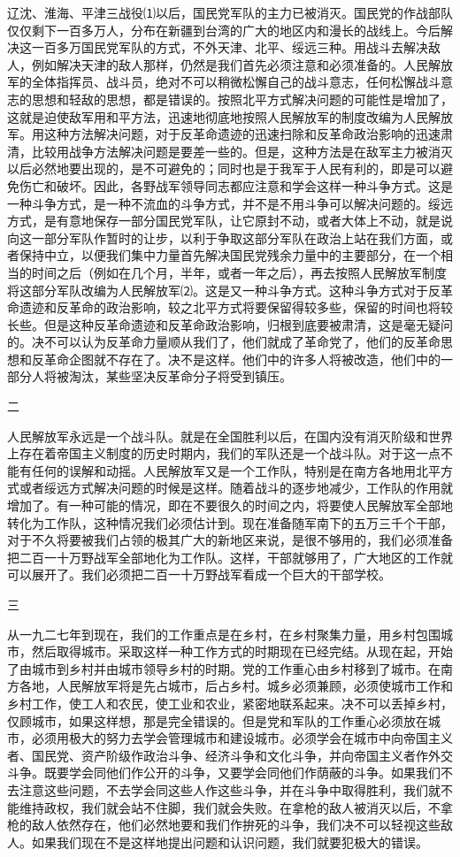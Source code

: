 \documentclass[UTF-8, a5paper, 12pt]{ctexart}
\begin{document}
辽沈、淮海、平津三战役⑴以后，国民党军队的主力已被消灭。国民党的作战部队仅仅剩下一百多万人，分布在新疆到台湾的广大的地区内和漫长的战线上。今后解决这一百多万国民党军队的方式，不外天津、北平、绥远三种。用战斗去解决敌人，例如解决天津的敌人那样，仍然是我们首先必须注意和必须准备的。人民解放军的全体指挥员、战斗员，绝对不可以稍微松懈自己的战斗意志，任何松懈战斗意志的思想和轻敌的思想，都是错误的。按照北平方式解决问题的可能性是增加了，这就是迫使敌军用和平方法，迅速地彻底地按照人民解放军的制度改编为人民解放军。用这种方法解决问题，对于反革命遗迹的迅速扫除和反革命政治影响的迅速肃清，比较用战争方法解决问题是要差一些的。但是，这种方法是在敌军主力被消灭以后必然地要出现的，是不可避免的；同时也是于我军于人民有利的，即是可以避免伤亡和破坏。因此，各野战军领导同志都应注意和学会这样一种斗争方式。这是一种斗争方式，是一种不流血的斗争方式，并不是不用斗争可以解决问题的。绥远方式，是有意地保存一部分国民党军队，让它原封不动，或者大体上不动，就是说向这一部分军队作暂时的让步，以利于争取这部分军队在政治上站在我们方面，或者保持中立，以便我们集中力量首先解决国民党残余力量中的主要部分，在一个相当的时间之后（例如在几个月，半年，或者一年之后），再去按照人民解放军制度将这部分军队改编为人民解放军⑵。这是又一种斗争方式。这种斗争方式对于反革命遗迹和反革命的政治影响，较之北平方式将要保留得较多些，保留的时间也将较长些。但是这种反革命遗迹和反革命政治影响，归根到底要被肃清，这是毫无疑问的。决不可以认为反革命力量顺从我们了，他们就成了革命党了，他们的反革命思想和反革命企图就不存在了。决不是这样。他们中的许多人将被改造，他们中的一部分人将被淘汰，某些坚决反革命分子将受到镇压。

二

人民解放军永远是一个战斗队。就是在全国胜利以后，在国内没有消灭阶级和世界上存在着帝国主义制度的历史时期内，我们的军队还是一个战斗队。对于这一点不能有任何的误解和动摇。人民解放军又是一个工作队，特别是在南方各地用北平方式或者绥远方式解决问题的时候是这样。随着战斗的逐步地减少，工作队的作用就增加了。有一种可能的情况，即在不要很久的时间之内，将要使人民解放军全部地转化为工作队，这种情况我们必须估计到。现在准备随军南下的五万三千个干部，对于不久将要被我们占领的极其广大的新地区来说，是很不够用的，我们必须准备把二百一十万野战军全部地化为工作队。这样，干部就够用了，广大地区的工作就可以展开了。我们必须把二百一十万野战军看成一个巨大的干部学校。

三

从一九二七年到现在，我们的工作重点是在乡村，在乡村聚集力量，用乡村包围城市，然后取得城市。采取这样一种工作方式的时期现在已经完结。从现在起，开始了由城市到乡村并由城市领导乡村的时期。党的工作重心由乡村移到了城市。在南方各地，人民解放军将是先占城市，后占乡村。城乡必须兼顾，必须使城市工作和乡村工作，使工人和农民，使工业和农业，紧密地联系起来。决不可以丢掉乡村，仅顾城市，如果这样想，那是完全错误的。但是党和军队的工作重心必须放在城市，必须用极大的努力去学会管理城市和建设城市。必须学会在城市中向帝国主义者、国民党、资产阶级作政治斗争、经济斗争和文化斗争，并向帝国主义者作外交斗争。既要学会同他们作公开的斗争，又要学会同他们作荫蔽的斗争。如果我们不去注意这些问题，不去学会同这些人作这些斗争，并在斗争中取得胜利，我们就不能维持政权，我们就会站不住脚，我们就会失败。在拿枪的敌人被消灭以后，不拿枪的敌人依然存在，他们必然地要和我们作拚死的斗争，我们决不可以轻视这些敌人。如果我们现在不是这样地提出问题和认识问题，我们就要犯极大的错误。
\end{document}
